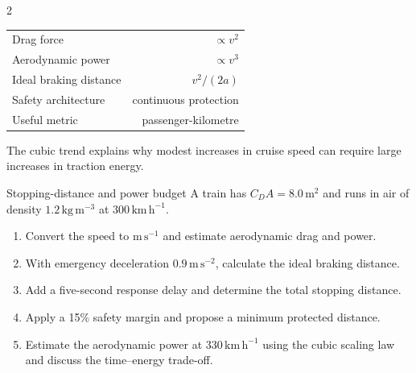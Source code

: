 \begin{multicols}{2}
\begin{keyfigures}
\begin{tabularx}{\linewidth}{@{}Xr@{}}
Drag force & $\propto v^2$\\
Aerodynamic power & $\propto v^3$\\
Ideal braking distance & $v^2/(2a)$\\
Safety architecture & continuous protection\\
Useful metric & passenger-kilometre
\end{tabularx}
\end{keyfigures}

\begin{tcolorbox}[title=\sffamily\bfseries Aerodynamic power versus speed,colback=white,colframe=ECBlue]
\begin{center}
\end{center}
\footnotesize The cubic trend explains why modest increases in cruise speed can require large increases in traction energy.
\end{tcolorbox}

\begin{applicationexercise}{Stopping-distance and power budget}
A train has $C_DA=8.0\,\mathrm{m^2}$ and runs in air of density $1.2\,\mathrm{kg\,m^{-3}}$ at
$300\,\mathrm{km\,h^{-1}}$.
\begin{enumerate}
\item Convert the speed to $\mathrm{m\,s^{-1}}$ and estimate aerodynamic drag and power.
\item With emergency deceleration $0.9\,\mathrm{m\,s^{-2}}$, calculate the ideal braking distance.
\item Add a five-second response delay and determine the total stopping distance.
\item Apply a 15\% safety margin and propose a minimum protected distance.
\item Estimate the aerodynamic power at $330\,\mathrm{km\,h^{-1}}$ using the cubic scaling law and discuss the time--energy trade-off.
\end{enumerate}
\end{applicationexercise}


\end{multicols}
